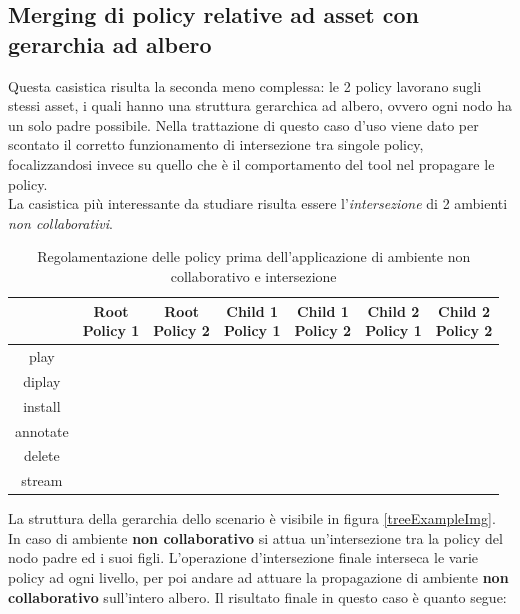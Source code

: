 \documentclass[12pt,a4paper,twoside]{book}
\begin{document}
\subsection{Merging di policy relative ad asset con gerarchia ad albero}
Questa casistica risulta la seconda meno complessa: le 2 policy lavorano sugli stessi asset, i quali hanno una struttura gerarchica ad albero, ovvero ogni nodo ha un solo padre possibile. Nella trattazione di questo caso d'uso viene dato per scontato il corretto funzionamento di intersezione tra singole policy, focalizzandosi invece su quello che è il comportamento del tool nel propagare le policy.\\
La casistica più interessante da studiare risulta essere l'\textit{intersezione} di 2 ambienti \textit{non collaborativi}.
\begin{table}[H]
\begin{tabular}{|c|c|c|c|c|c|c|}
\hline
{} & \makecell{\textbf{Root} \\\textbf{Policy 1}} & \makecell{\textbf{Root} \\\textbf{Policy 2}} & \makecell{\textbf{Child 1} \\\textbf{Policy 1}} & \makecell{\textbf{Child 1} \\\textbf{Policy 2}} & \makecell{\textbf{Child 2} \\\textbf{Policy 1}} & \makecell{\textbf{Child 2} \\\textbf{Policy 2}} \\
\hline
{play} & \cellcolor{green!25} & \cellcolor{green!25} & {} & {} & {} & {} \\
\hline
{diplay} & \cellcolor{green!25}& \cellcolor{green!25} & {} & \cellcolor{green!25} & {} & {} \\
\hline
{install} & \cellcolor{green!25} & \cellcolor{green!25} & \cellcolor{green!25} & \cellcolor{green!25} & {} &\cellcolor{green!25} \\
\hline
{annotate} & \cellcolor{green!25} & {} & {} & {} & \cellcolor{green!25} & \cellcolor{red!25} \\
\hline
{delete} & \cellcolor{red!25} & \cellcolor{red!25} & {}&  {} & \cellcolor{red!25} & {}\\
\hline
{stream} & {} & {} & \cellcolor{red!25} & \cellcolor{red!25} & {} &  {}\\
\hline

\end{tabular}
\caption{Regolamentazione delle policy prima dell'applicazione di ambiente non collaborativo e intersezione}
\label{tableTree}
\end{table}
La struttura della gerarchia dello scenario è visibile in figura \ref{treeExampleImg}. In caso di ambiente \textbf{non collaborativo} si attua un'intersezione tra la policy del nodo padre ed i suoi figli. L'operazione d'intersezione finale interseca le varie policy ad ogni livello, per poi andare ad attuare la propagazione di ambiente \textbf{non collaborativo} sull'intero albero. Il risultato finale in questo caso è quanto segue:
\end{document}
